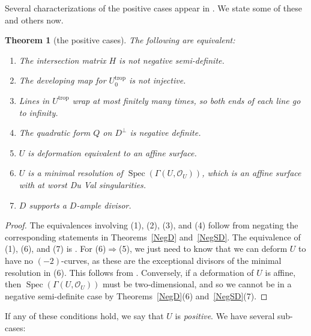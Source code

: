 \documentclass[pdftex]{sigma}
\numberwithin{equation}{section}
\numberwithin{figure}{section}
\numberwithin{table}{section}
\DeclareMathOperator{\Spec}{Spec}
\DeclareMathOperator{\trop}{trop}
\let\s=\mathcal
\newtheorem{thm}{Theorem}[section]
\theoremstyle{definition}
\begin{document}
Several characterizations of the positive cases appear in \cite[Lemma~6.9]{GHK1}. We state some of these and others now.
\begin{thm}[the positive cases]\label{Pos} The following are equivalent:
\begin{enumerate}\itemsep=0pt
\item[$1.$] The {intersection matrix} $H$ is not negative semi-definite.
\item[$2.$] The {developing map} for $U^{\trop}_0$ is not injective.
\item[$3.$] {Lines} in $U^{\trop}$ wrap at most finitely many times, so both ends of each line go to infinity.
\item[$4.$] The {quadratic form} $Q$ on $D^{\perp}$ is negative definite.
\item[$5.$] $U$ is deformation equivalent to an affine surface.
\item[$6.$] $U$ is a minimal resolution of $\Spec (\Gamma(U,\s{O}_U))$, which is an affine surface with at worst Du Val singularities.
\item[$7.$] $D$ supports a $D$-ample divisor.
\end{enumerate}
\end{thm}
\begin{proof}The equivalences involving (1), (2), (3), and (4) follow from negating the corresponding statements in Theorems~\ref{NegD} and~\ref{NegSD}. The equivalence of (1), (6), and (7) is \cite[Lemma~6.9(1.1--1.3)]{GHK1}. For (6)$\Rightarrow$(5), we just need to know that we can deform $U$ to have no $(-2)$-curves, as these are the exceptional divisors of the minimal resolution in (6). This follows from \cite[Proposition~4.1]{GHK_MLP}. Conversely, if a deformation of $U$ is affine, then $\Spec (\Gamma(U,\s{O}_U))$ must be two-dimensional, and so we cannot be in a negative semi-definite case by Theorems~\ref{NegD}(6) and~\ref{NegSD}(7).
\end{proof}

If any of these conditions hold, we say that $U$ is {\it positive}. We have several sub-cases:
\end{document}
